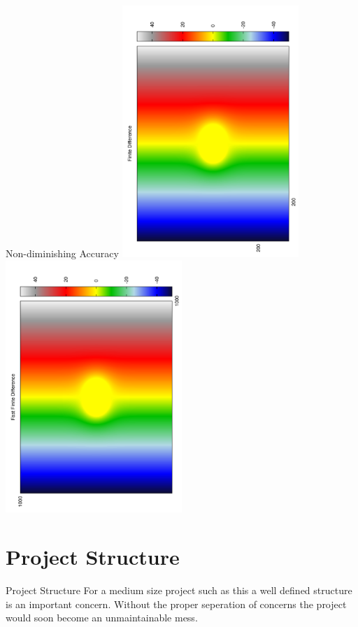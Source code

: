 \documentclass{beamer}
\begin{document}
\begin{frame}{Non-diminishing Accuracy}
    \includegraphics[angle=-90,width=0.5\textwidth]{fd.pdf}
    \includegraphics[angle=-90,width=0.5\textwidth]{ffd.pdf}
\end{frame} 

\section{Project Structure}

\begin{frame}{Project Structure}
    For a medium size project such as this a well defined structure is an important concern.
    Without the proper seperation of concerns the project would soon become an unmaintainable mess.
\end{frame}
\end{document}
